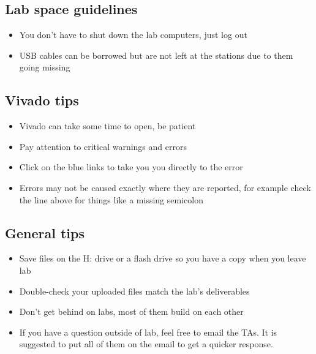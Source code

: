 \documentclass[letterpaper]{article}
\begin{document}
\subsection*{Lab space guidelines}
\begin{itemize}
    \item You don't have to shut down the lab computers, just log out
    \item USB cables can be borrowed but are not left at the stations due to them going missing
\end{itemize}

\subsection*{Vivado tips}
\begin{itemize}
    \item Vivado can take some time to open, be patient
    \item Pay attention to critical warnings and errors
    \item Click on the blue links to take you you directly to the error
    \item Errors may not be caused exactly where they are reported, for example check the line
          above for things like a missing semicolon
\end{itemize}

\subsection*{General tips}
\begin{itemize}
    \item Save files on the H: drive or a flash drive so you have a copy when you leave lab
    \item Double-check your uploaded files match the lab's deliverables
    \item Don't get behind on labs,­ most of them build on each other
    \item If you have a question outside of lab, feel free to email the TAs.
          It is suggested to put all of them on the email to get a quicker response.
\end{itemize}
\end{document}

